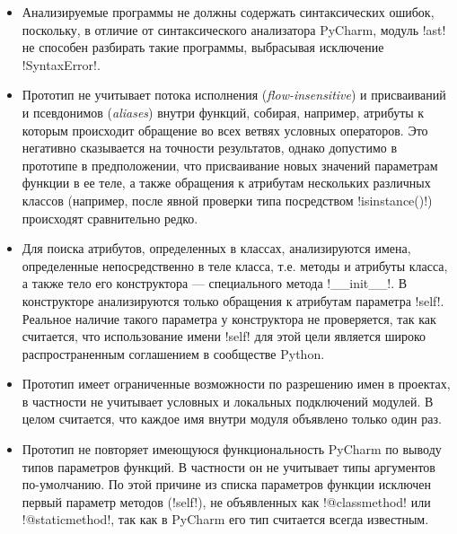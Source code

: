 \begin{itemize} 
  \item Анализируемые программы не должны содержать синтаксических ошибок,
    поскольку, в отличие от синтаксического анализатора PyCharm, модуль !ast! не
    способен разбирать такие программы, выбрасывая исключение !SyntaxError!.

  \item Прототип не учитывает потока исполнения (\emph{flow-insensitive}) и
    присваиваний и псевдонимов (\emph{aliases}) внутри функций, собирая, например,
    атрибуты к которым происходит обращение во всех ветвях условных операторов.
    Это негативно сказывается на точности результатов, однако допустимо в
    прототипе в предположении, что присваивание новых значений параметрам
    функции в ее теле, а также обращения к атрибутам нескольких различных
    классов (например, после явной проверки типа посредством !isinstance()!)
    происходят сравнительно редко.

  \item Для поиска атрибутов, определенных в классах, анализируются имена,
    определенные непосредственно в теле класса, т.е. методы и атрибуты
    класса, а также тело его конструктора --- специального метода !__init__!. В
    конструкторе анализируются только обращения к атрибутам параметра !self!.
    Реальное наличие такого параметра у конструктора не проверяется, так как
    считается, что использование имени !self! для этой цели является широко
    распространенным соглашением в сообществе Python.

  \item Прототип имеет ограниченные возможности по разрешению имен в проектах, в
    частности не учитывает условных и локальных подключений модулей. В целом
    считается, что каждое имя внутри модуля объявлено только один раз.

  \item Прототип не повторяет имеющуюся функциональность PyCharm по выводу
    типов параметров функций. В частности он не учитывает типы
    аргументов по-умолчанию. По этой причине из списка параметров функции
    исключен первый параметр методов (!self!), не объявленных как !@classmethod!
    или !@staticmethod!, так как в PyCharm его тип считается всегда известным.

\end{itemize}




